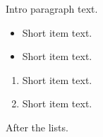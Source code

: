 \documentclass[10pt]{article}
\begin{document}
Intro paragraph text.
\begin{itemize}
\item Short item text.
\item Short item text.
\end{itemize}
\begin{enumerate}
\item Short item text.
\item Short item text.
\end{enumerate}
After the lists.
\end{document}
